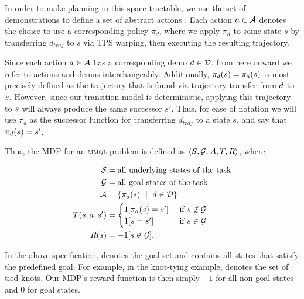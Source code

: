 In order to make planning in this space tractable, we use the set of
demonstrations \demoset{} to define a set of abstract actions \actionset{}. Each
action $a \in \mathcal{A}$ denotes the choice to use a corresponding
policy $\pi_d$, where we apply $\pi_d$ to some state $s$ by transferring
$d_{traj}$ to $s$ via TPS warping, then executing the resulting trajectory.

Since each action $a \in \mathcal{A}$ has a corresponding demo $d
\in \mathcal{D}$, from here onward we refer to actions and demos
interchangeably. Additionally, $\pi_{d}(s) =
\pi_{a}(s)$ is most precisely defined as the trajectory that is
found via trajectory transfer from $d$ to $s$. However, since our
transition model is deterministic, applying this trajectory to $s$ will
always produce the same successor $s'$. Thus, for ease of notation we will use
$\pi_{d}$ as the successor function for transferring $d_{traj}$ to a state $s$,
and say that $\pi_{d}(s) = s'$.

Thus, the MDP for an \textsc{mmql} problem is defined as
$\langle\mathcal{S},\mathcal{G},\mathcal{A},T,R\rangle$, where

\begin{align*}
\mathcal{S}{} &=  \text{all underlying states of the task} \\
\mathcal{G}{} &=  \text{all goal states of the task} \\
\mathcal{A}{} &= \{\pi_{d{}}(s{})\ \mid \text{ } d{} \in \mathcal{D}{}\} \\
T{}(s{}, a{}, s'{}) &=
    \begin{cases}
    1[\pi_{a{}}(s{}) = s'{}] &\text{ if } s{} \not \in \mathcal{G}{} \\
    1[s{} = s{}'] &\text{ if } s{} \in \mathcal{G}{}
    \end{cases}\\
R(s{}) &= -1 {[ s{} \not \in \mathcal{G}{} ]}. \\
\end{align*}

In the above specification, \goalset{} denotes the goal set and contains all
states that satisfy the predefined goal. For example, in the knot-tying example,
\goalset{} denotes the set of tied knots.  Our MDP's reward function is then
simply $-1$ for all non-goal states and $0$ for goal states.

